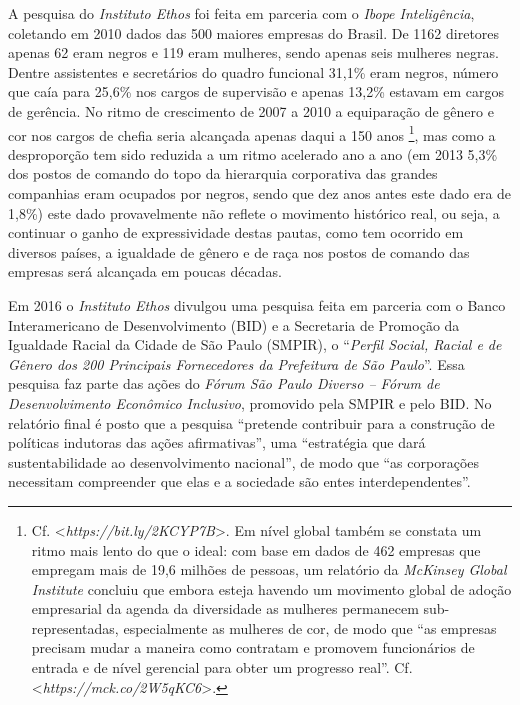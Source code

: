 A pesquisa do \emph{Instituto Ethos} foi feita em parceria com o
\emph{Ibope Inteligência}, coletando em 2010 dados das 500 maiores
empresas do Brasil. De 1162 diretores apenas 62 eram negros e 119 eram
mulheres, sendo apenas seis mulheres negras. Dentre assistentes e
secretários do quadro funcional 31,1\% eram negros, número que caía para
25,6\% nos cargos de supervisão e apenas 13,2\% estavam em cargos de
gerência. No ritmo de crescimento de 2007 a 2010 a equiparação de gênero
e cor nos cargos de chefia seria alcançada apenas daqui a 150 anos
\footnote{Cf. \textless{}\emph{https://bit.ly/2KCYP7B}\textgreater{}.
  Em nível global também se constata um ritmo mais lento do que o ideal:
  com base em dados de 462 empresas que empregam mais de 19,6 milhões de
  pessoas, um relatório da \emph{McKinsey Global Institute} concluiu que
  embora esteja havendo um movimento global de adoção empresarial da
  agenda da diversidade as mulheres permanecem sub-representadas,
  especialmente as mulheres de cor, de modo que ``as empresas precisam
  mudar a maneira como contratam e promovem funcionários de entrada e de
  nível gerencial para obter um progresso real''. Cf.
  \textless{}\emph{https://mck.co/2W5qKC6}\textgreater{}.},
mas como a desproporção tem sido reduzida a um ritmo acelerado ano a ano
(em 2013 5,3\% dos postos de comando do topo da hierarquia corporativa
das grandes companhias eram ocupados por negros, sendo que dez anos
antes este dado era de 1,8\%) este dado provavelmente não reflete o
movimento histórico real, ou seja, a continuar o ganho de expressividade
destas pautas, como tem ocorrido em diversos países, a igualdade de
gênero e de raça nos postos de comando das empresas será alcançada em
poucas décadas.

Em 2016 o \emph{Instituto Ethos} divulgou uma pesquisa feita em parceria
com o Banco Interamericano de Desenvolvimento (BID) e a Secretaria de
Promoção da Igualdade Racial da Cidade de São Paulo (SMPIR), o
``\emph{Perfil Social, Racial e de Gênero dos 200 Principais
Fornecedores da Prefeitura de São Paulo}''. Essa pesquisa faz parte das
ações do \emph{Fórum São Paulo Diverso -- Fórum de Desenvolvimento
Econômico Inclusivo}, promovido pela SMPIR e pelo BID. No relatório
final é posto que a pesquisa ``pretende contribuir para a construção de
políticas indutoras das ações afirmativas'', uma ``estratégia que dará
sustentabilidade ao desenvolvimento nacional'', de modo que ``as
corporações necessitam compreender que elas e a sociedade são entes
interdependentes''.

